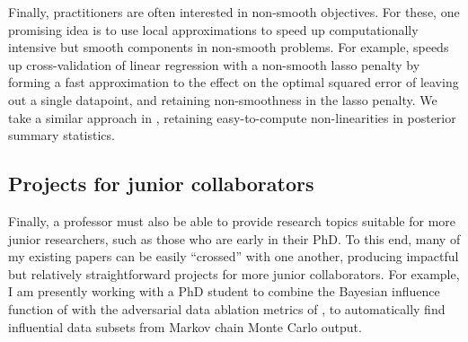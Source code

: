 Finally, practitioners are often interested in non-smooth objectives. For these,
one promising idea is to use local approximations to speed up computationally
intensive but smooth components in non-smooth problems. For example,
\citet{wilson:2020:approximatecv} speeds up cross-validation of linear
regression with a non-smooth lasso penalty by forming a fast approximation to
the effect on the optimal squared error of leaving out a single datapoint, and
retaining non-smoothness in the lasso penalty. We take a similar approach in
\citet{giordano:2021:bnpsensitivity}, retaining easy-to-compute non-linearities
in posterior summary statistics.


\subsection{Projects for junior collaborators}

Finally, a professor must also be able to provide research topics suitable for
more junior researchers, such as those who are early in their PhD.  To this end,
many of my existing papers can be easily ``crossed'' with one another, producing
impactful but relatively straightforward projects for more junior collaborators.
For example, I am presently working with a PhD student to combine the Bayesian
influence function of \citet{giordano:2021:bayesij} with the adversarial data
ablation metrics of \citet{giordano:2020:amip}, to automatically find
influential data subsets from Markov chain Monte Carlo output.


\newpage





